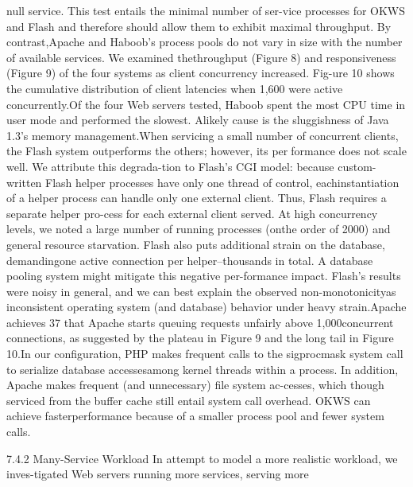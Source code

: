 null service. This test entails the minimal number of ser-vice processes for OKWS and Flash and therefore should
allow them to exhibit maximal throughput. By contrast,Apache and Haboob's process pools do not vary in size
with the number of available services. We examined thethroughput (Figure 8) and responsiveness (Figure 9) of
the four systems as client concurrency increased. Fig-ure 10 shows the cumulative distribution of client latencies when 1,600 were active concurrently.Of the four Web servers tested, Haboob spent the most
CPU time in user mode and performed the slowest. Alikely cause is the sluggishness of Java 1.3's memory
management.When servicing a small number of concurrent clients,
the Flash system outperforms the others; however, its performance does not scale well. We attribute this degrada-tion to Flash's CGI model: because custom-written Flash
helper processes have only one thread of control, eachinstantiation of a helper process can handle only one external client. Thus, Flash requires a separate helper pro-cess for each external client served. At high concurrency
levels, we noted a large number of running processes (onthe order of 2000) and general resource starvation. Flash
also puts additional strain on the database, demandingone active connection per helper--thousands in total. A
database pooling system might mitigate this negative per-formance impact. Flash's results were noisy in general,
and we can best explain the observed non-monotonicityas inconsistent operating system (and database) behavior
under heavy strain.Apache achieves 37%
that Apache starts queuing requests unfairly above 1,000concurrent connections, as suggested by the plateau in
Figure 9 and the long tail in Figure 10.In our configuration, PHP makes frequent calls to the
sigprocmask system call to serialize database accessesamong kernel threads within a process. In addition,
Apache makes frequent (and unnecessary) file system ac-cesses, which though serviced from the buffer cache still
entail system call overhead. OKWS can achieve fasterperformance because of a smaller process pool and fewer
system calls.

7.4.2 Many-Service Workload
In attempt to model a more realistic workload, we inves-tigated Web servers running more services, serving more

